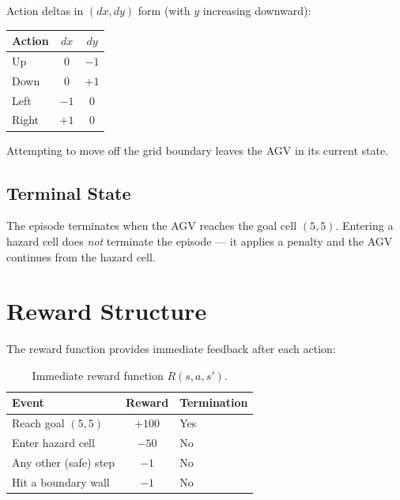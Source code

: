\documentclass[12pt]{article}
\begin{document}
Action deltas in $(dx, dy)$ form (with $y$ increasing downward):

\begin{center}
\begin{tabular}{@{} l c c @{}}
\toprule
\textbf{Action} & $dx$ & $dy$ \\
\midrule
Up    &  0 & $-1$ \\
Down  &  0 & $+1$ \\
Left  & $-1$ & 0 \\
Right & $+1$ & 0 \\
\bottomrule
\end{tabular}
\end{center}

Attempting to move off the grid boundary leaves the AGV in its current state.

\subsection{Terminal State}

The episode terminates when the AGV reaches the goal cell $(5,5)$.
Entering a hazard cell does \emph{not} terminate the episode --- it applies a
penalty and the AGV continues from the hazard cell.

\section{Reward Structure}

The reward function provides immediate feedback after each action:

\begin{table}[H]
\centering
\begin{tabular}{@{} l c l @{}}
\toprule
\textbf{Event} & \textbf{Reward} & \textbf{Termination} \\
\midrule
Reach goal $(5,5)$         & $+100$ & Yes \\
Enter hazard cell          & $-50$  & No  \\
Any other (safe) step      & $-1$   & No  \\
Hit a boundary wall        & $-1$   & No  \\
\bottomrule
\end{tabular}
\caption{Immediate reward function $R(s, a, s')$.}
\end{table}
\end{document}
